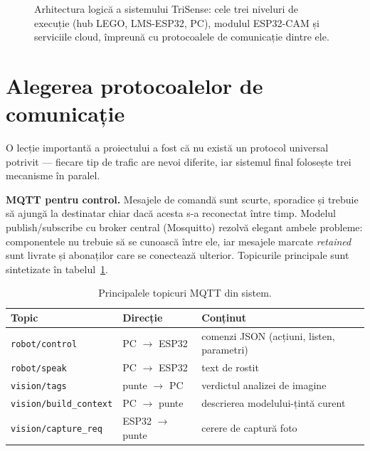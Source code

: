\begin{figure}[htb]
{%
    }
    \caption{Arhitectura logică a sistemului TriSense: cele trei niveluri de execuție (hub LEGO, LMS-ESP32, PC), modulul ESP32-CAM și serviciile cloud, împreună cu protocoalele de comunicație dintre ele.}
    \label{fig:arhitectura}
\end{figure}

\section{Alegerea protocoalelor de comunicație}

O lecție importantă a proiectului a fost că nu există un protocol universal potrivit — fiecare tip de trafic are nevoi diferite, iar sistemul final folosește trei mecanisme în paralel.

\textbf{MQTT pentru control.} Mesajele de comandă sunt scurte, sporadice și trebuie să ajungă la destinatar chiar dacă acesta s-a reconectat între timp. Modelul publish/subscribe cu broker central (Mosquitto) rezolvă elegant ambele probleme: componentele nu trebuie să se cunoască între ele, iar mesajele marcate \emph{retained} sunt livrate și abonaților care se conectează ulterior. Topicurile principale sunt sintetizate în tabelul~\ref{tab:topicuri}.

\begin{table}[htb]
    \centering
    \caption{Principalele topicuri MQTT din sistem.}
    \label{tab:topicuri}
    \begin{tabular}{|l|l|l|}
        \hline
        \textbf{Topic} & \textbf{Direcție} & \textbf{Conținut} \\
        \hline
        \texttt{robot/control} & PC $\rightarrow$ ESP32 & comenzi JSON (acțiuni, listen, parametri) \\
        \texttt{robot/speak} & PC $\rightarrow$ ESP32 & text de rostit \\
        \texttt{vision/tags} & punte $\rightarrow$ PC & verdictul analizei de imagine \\
        \texttt{vision/build\_context} & PC $\rightarrow$ punte & descrierea modelului-țintă curent \\
        \texttt{vision/capture\_req} & ESP32 $\rightarrow$ punte & cerere de captură foto \\
        \hline
    \end{tabular}
\end{table}

